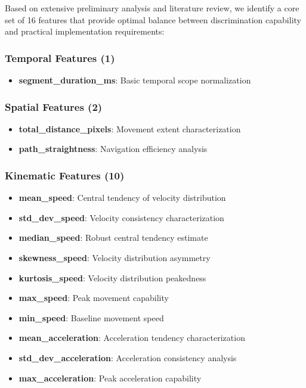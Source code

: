 \documentclass[
  12pt,
  a4paper,
]{report}
\providecommand{\tightlist}{%
  \setlength{\itemsep}{0pt}\setlength{\parskip}{0pt}}
\begin{document}
Based on extensive preliminary analysis and literature review, we
identify a core set of 16 features that provide optimal balance between
discrimination capability and practical implementation requirements:

\subsubsection{Temporal Features (1)}\label{temporal-features-1}

\begin{itemize}
\tightlist
\item
  \textbf{segment\_duration\_ms}: Basic temporal scope normalization
\end{itemize}

\subsubsection{Spatial Features (2)}\label{spatial-features-2}

\begin{itemize}
\tightlist
\item
  \textbf{total\_distance\_pixels}: Movement extent characterization
\item
  \textbf{path\_straightness}: Navigation efficiency analysis
\end{itemize}

\subsubsection{Kinematic Features (10)}\label{kinematic-features-10}

\begin{itemize}
\tightlist
\item
  \textbf{mean\_speed}: Central tendency of velocity distribution
\item
  \textbf{std\_dev\_speed}: Velocity consistency characterization
\item
  \textbf{median\_speed}: Robust central tendency estimate
\item
  \textbf{skewness\_speed}: Velocity distribution asymmetry
\item
  \textbf{kurtosis\_speed}: Velocity distribution peakedness
\item
  \textbf{max\_speed}: Peak movement capability
\item
  \textbf{min\_speed}: Baseline movement speed
\item
  \textbf{mean\_acceleration}: Acceleration tendency characterization
\item
  \textbf{std\_dev\_acceleration}: Acceleration consistency analysis
\item
  \textbf{max\_acceleration}: Peak acceleration capability
\end{itemize}
\end{document}
